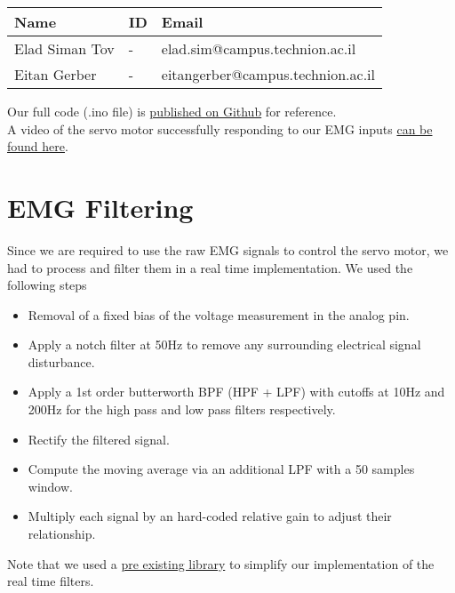 \documentclass[10pt]{article}
\begin{document}
\begin{table}[h]
    \centering
    \begin{tabular}{l l l}
        \hline
        Name & ID & Email \\
        \hline
        Elad Siman Tov & - & elad.sim@campus.technion.ac.il \\
        \hline
        Eitan Gerber & - & eitangerber@campus.technion.ac.il \\
        \hline
    \end{tabular}
    \label{tab:personal_info}
\end{table}
\noindent Our full code (.ino file) is \href{https://github.com/eladsimantov/Wearable-Robotics/blob/main/HW3/EMG_servo_control.ino}{published on Github} for reference.\\
A video of the servo motor successfully responding to our EMG inputs \href{https://technionmail-my.sharepoint.com/:v:/g/personal/eitangerber_campus_technion_ac_il/Ead1dbEn8xNEuNcpJJbua7sBZmVPV9wEbOwiU09-S7oXpg?e=Y54jJX}{can be found here}.

\section{EMG Filtering}
Since we are required to use the raw EMG signals to control the servo motor, we had to process and filter them in a real time implementation. We used the following steps
\begin{itemize}
    \item Removal of a fixed bias of the voltage measurement in the analog pin.  
    \item Apply a notch filter at 50Hz to remove any surrounding electrical signal disturbance.
    \item Apply a 1st order butterworth BPF (HPF + LPF) with cutoffs at 10Hz and 200Hz for the high pass and low pass filters respectively.
    \item Rectify the filtered signal.
    \item Compute the moving average via an additional LPF with a 50 samples window.
    \item Multiply each signal by an hard-coded relative gain to adjust their relationship.  
\end{itemize}
Note that we used a \href{https://github.com/tttapa/Arduino-Filters}{pre existing library} to simplify our implementation of the real time filters. 
\end{document}
